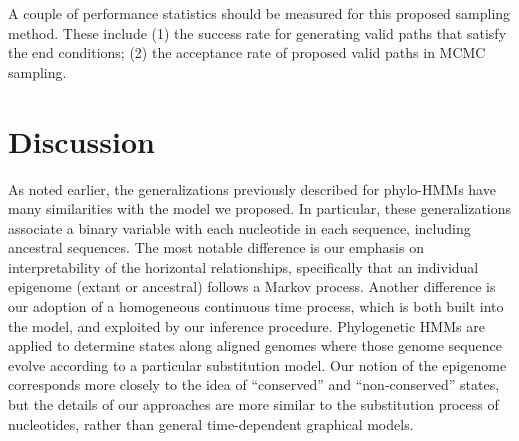 \documentclass[11pt]{article}
\begin{document}

A couple of performance statistics should be measured for this
proposed sampling method. These include (1) the success rate for
generating valid paths that satisfy the end conditions; (2) the
acceptance rate of proposed valid paths in MCMC sampling.

\section{Discussion}

As noted earlier, the generalizations previously described for
phylo-HMMs have many similarities with the model we proposed. In
particular, these generalizations associate a binary variable with
each nucleotide in each sequence, including ancestral sequences.  The
most notable difference is our emphasis on interpretability of the
horizontal relationships, specifically that an individual epigenome
(extant or ancestral) follows a Markov process. Another difference is
our adoption of a homogeneous continuous time process, which is both
built into the model, and exploited by our inference
procedure. Phylogenetic HMMs are applied to determine states along
aligned genomes where those genome sequence evolve according to a
particular substitution model. Our notion of the epigenome corresponds
more closely to the idea of ``conserved'' and ``non-conserved''
states, but the details of our approaches are more similar to the
substitution process of nucleotides, rather than general
time-dependent graphical models.

\clearpage



\end{document}
